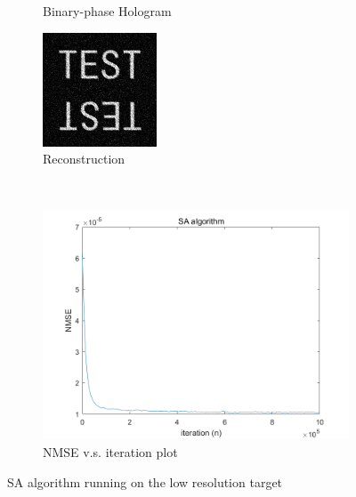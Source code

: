 \begin{figure}[H]
\begin{subfigure}[t]{0.3\textwidth}
    \caption{Binary-phase Hologram}
    \label{fig:SA_test_128_Holo}
  \end{subfigure}
  \hfill
  \begin{subfigure}[t]{0.3\textwidth}
    \centering
    \includegraphics[width=\textwidth]{SA_test_128_recon_intensity.png}
    \caption{Reconstruction}
    \label{fig:SA_test_128_recon_intensity}
  \end{subfigure}
  \\
  \begin{subfigure}[t]{0.7\textwidth}
    \centering
    \includegraphics[width=\textwidth]{SA_test_128_convergence.png}
    \caption{NMSE v.s. iteration plot}
    \label{fig:SA_test_128_convergence}
  \end{subfigure}
  \caption{SA algorithm running on the low resolution target}
  \label{fig:SA algorithm running on the low resolution target}
\end{figure}

